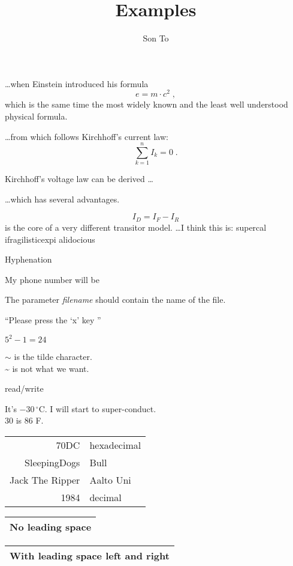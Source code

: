 \documentclass[a4paper]{report}
\title{Examples}
\author{Son To}
\begin{document}
\maketitle
  \ldots when Einstein introduced his formula
  \begin{equation}
    e = m \cdot c^2 \; ,
  \end{equation}
  which is the same time the most widely known
  and the least well understood physical formula.

  \ldots from which follows Kirchhoff's current law:
  \begin{equation}
    \sum_{k=1}^{n} I_k = 0 \; .
  \end{equation}

  Kirchhoff's voltage law can be derived \ldots

  \ldots which has several advantages.

  \begin{equation}
    I_D = I_F - I_R
  \end{equation}
  is the core of a very different transitor model. \ldots  I think this is:
  su\-per\-cal\-%
  i\-frag\-i\-lis\-tic\-ex\-pi\-%
  al\-i\-do\-cious

  Hyphenation

  My phone number will be 

  The parameter \mbox{\emph{filename}} should contain
  the name of the file.

  ``Please press the `x' key ''

  $5^2-1=24$

  $\sim$ is the tilde character. \\
  \~{} is not what we want.

  read\slash write %

  It's $-30\,^{\circ}\mathrm{C}$. I will start to
  super-conduct.\\
  30 \textcelsius{} is 86 \textdegree{}F.

  \begin{tabular}{|r|l|}
    \hline
    70DC & hexadecimal \\
    SleepingDogs & Bull \\ \cline{2-2} %
    Jack The Ripper & Aalto Uni \\
    \hline \hline
    1984 & decimal \\
    \hline
  \end{tabular}

  \begin{tabular}{@{} l @{}}
    \hline
    No leading space\\
    \hline
  \end{tabular}

  \begin{tabular}{l}
    \hline
    With leading space left and right \\
    \hline
  \end{tabular}
\end{document}
